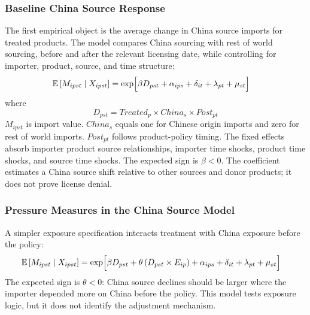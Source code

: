 \documentclass[12pt,a4paper]{article}
\numberwithin{equation}{section}
\begin{document}
\subsubsection{Baseline China Source Response}

The first empirical object is the average change in China source imports for treated products. The model compares China sourcing with rest of world sourcing, before and after the relevant licensing date, while controlling for importer, product, source, and time structure:
\begin{equation}
\begin{aligned}
\mathbb{E}\left[M_{ipst}\mid X_{ipst}\right]
&=\exp\Bigl[
\beta D_{pst}
+\alpha_{ips}
+\delta_{it}
+\lambda_{pt}
+\mu_{st}
\Bigr]
\end{aligned}
\end{equation}
where
\begin{equation}
D_{pst}=Treated_p\times China_s\times Post_{pt}
\end{equation}
\(M_{ipst}\) is import value. \(China_s\) equals one for Chinese origin imports and zero for rest of world imports. \(Post_{pt}\) follows product-policy timing. The fixed effects absorb importer product source relationships, importer time shocks, product time shocks, and source time shocks. The expected sign is \(\beta<0\). The coefficient estimates a China source shift relative to other sources and donor products; it does not prove license denial.

\subsubsection{Pressure Measures in the China Source Model}

A simpler exposure specification interacts treatment with China exposure before the policy:
\begin{equation}
\begin{aligned}
\mathbb{E}\left[M_{ipst}\mid X_{ipst}\right]
&=\exp\Bigl[
\beta D_{pst}
+\theta\left(D_{pst}\times E_{ip}\right)
+\alpha_{ips}
+\delta_{it}
+\lambda_{pt}
+\mu_{st}
\Bigr]
\end{aligned}
\end{equation}
The expected sign is \(\theta<0\): China source declines should be larger where the importer depended more on China before the policy. This model tests exposure logic, but it does not identify the adjustment mechanism.
\end{document}
